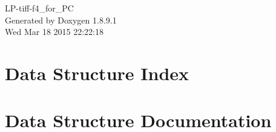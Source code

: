 \documentclass[twoside]{book}
\newcommand{\+}{\discretionary{\mbox{\scriptsize$\hookleftarrow$}}{}{}}
\newcommand{\clearemptydoublepage}{%
  \newpage{\pagestyle{empty}\cleardoublepage}%
}
\begin{document}
\hypersetup{pageanchor=false,
             bookmarks=true,
             bookmarksnumbered=true,
             pdfencoding=unicode
            }
\begin{titlepage}
\vspace*{7cm}
\begin{center}%
{\Large L\+P-\/tiff-\/f4\+\_\+for\+\_\+\+P\+C }\\
\vspace*{1cm}
{\large Generated by Doxygen 1.8.9.1}\\
\vspace*{0.5cm}
{\small Wed Mar 18 2015 22:22:18}\\
\end{center}
\end{titlepage}
\clearemptydoublepage
\tableofcontents
\clearemptydoublepage
{}
\hypersetup{pageanchor=true}

\chapter{Data Structure Index}

\chapter{Data Structure Documentation}






































\backmatter
\newpage
{}
\clearemptydoublepage
{}
\printindex
\end{document}
